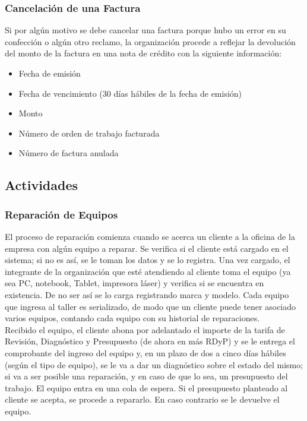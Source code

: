 \documentclass[12pt]{extarticle}
\begin{document}
\begin{spacing}{1.2}
        \subsubsection*{Cancelación de una Factura}
        Si por algún motivo se debe cancelar una factura porque hubo un error en su confección o algún otro reclamo, la organización procede a reflejar la devolución del monto de la factura en una nota de crédito con la siguiente información: \\
        \begin{itemize}
            \item Fecha de emisión
            \item Fecha de vencimiento (30 días hábiles de la fecha de emisión)
            \item Monto
            \item Número de orden de trabajo facturada
            \item Número de factura anulada
        \end{itemize}

        \pagebreak
        \subsection{Actividades}

        \subsubsection{Reparación de Equipos}
        El proceso de reparación comienza cuando se acerca un cliente a la oficina de la empresa con algún equipo a reparar. Se verifica si el cliente está cargado en el sistema; si no es así, se le toman los datos y se lo registra. Una vez cargado, el integrante de la organización que esté atendiendo al cliente toma el equipo (ya sea PC, notebook, Tablet, impresora láser) y verifica si se encuentra en existencia. De no ser así se lo carga registrando marca y modelo. Cada equipo que ingresa al taller es serializado, de modo que un cliente puede tener asociado varios equipos, contando cada equipo con su historial de reparaciones.\\

        Recibido el equipo, el cliente abona por adelantado el importe de la tarifa de Revisión, Diagnóstico y Presupuesto (de ahora en más RDyP) y se le entrega el comprobante del ingreso del equipo y, en un plazo de dos a cinco días hábiles (según el tipo de equipo), se le va a dar un diagnóstico sobre el estado del mismo; si va a ser posible una reparación, y en caso de que lo sea, un presupuesto del trabajo. El equipo entra en una cola de espera. Si el presupuesto planteado al cliente se acepta, se procede a repararlo. En caso contrario se le devuelve el equipo.\\


\end{spacing}
\end{document}
